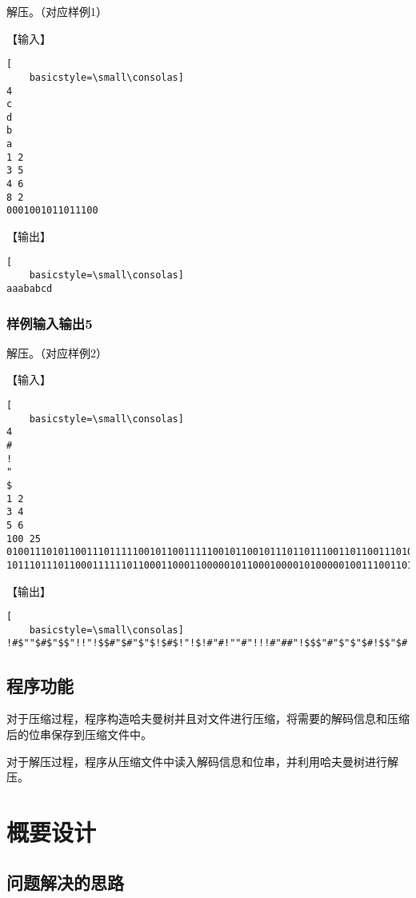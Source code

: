 \documentclass{article}
\begin{document}
解压。（对应样例1）

【输入】

\begin{lstlisting}[
    basicstyle=\small\consolas]
4
c
d
b
a
1 2
3 5
4 6
8 2
0001001011011100
\end{lstlisting}

【输出】

\begin{lstlisting}[
    basicstyle=\small\consolas]
aaababcd
\end{lstlisting}

\subsubsection{样例输入输出5}

解压。（对应样例2）

【输入】

\begin{lstlisting}[
    basicstyle=\small\consolas]
4
#
!
"
$
1 2
3 4
5 6
100 25
010011101011001110111110010110011111001011001011101101110011011001110100100001101000100101010010000010011111111000
10111011101100011111101100011000110000010110001000010100000100111001101011011001001111
\end{lstlisting}

【输出】

\begin{lstlisting}[
    basicstyle=\small\consolas]
!#$""$#$"$$"!!"!$$#"$#"$"$!$#$!"!$!#"#!""#"!!!#"##"!$$$"#"$"$"$#!$$"$#!"#$##!!"#"#!!##!#$"!""$!"!#$$
\end{lstlisting}

\subsection{程序功能}

对于压缩过程，程序构造哈夫曼树并且对文件进行压缩，将需要的解码信息和压缩后的位串保存到压缩文件中。

对于解压过程，程序从压缩文件中读入解码信息和位串，并利用哈夫曼树进行解压。

\section{概要设计}

\subsection{问题解决的思路}
\end{document}
